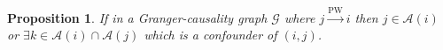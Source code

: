 \documentclass{statsoc}
\def\pwgc{\overset{\text{PW}}{\rightarrow}}  %
\def\gcg{\mathcal{G}}  %
\def\H{\mathcal{H}}  %
\newcommand{\linE}[2]{\hat{\E}[#1\ |\ #2]}  %
\newcommand{\anc}[1]{\mathcal{A}(#1)}  %
\newtheorem{proposition}{Proposition}
\def\H{\mathcal{H}}  %
\def\E{\mathbb{E}}  %
\newcommand{\inner}[2]{\langle #1, #2 \rangle}  %
\begin{document}




\begin{proposition}
  \label{prop:ancestor_properties}
  If in a Granger-causality graph $\gcg$ where $j \pwgc i$ then
  $j \in \anc{i}$ or $\exists k \in \anc{i} \cap\anc{j}$ which is a
  confounder of $(i, j)$.
\end{proposition}
\end{document}
